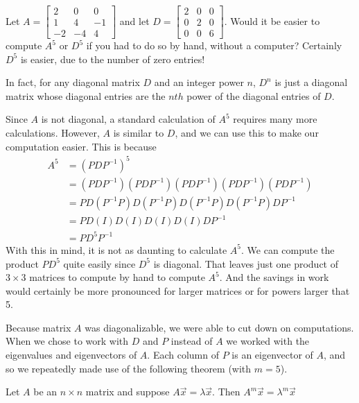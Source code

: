 \documentclass{ximera}
\begin{document}
  \begin{exploration}

  Let $A=\begin{bmatrix}
  2 & 0 & 0 \\
  1 & 4 & -1 \\
  -2 & -4 & 4
  \end{bmatrix}$ and let $D=\begin{bmatrix}
  2 & 0 & 0 \\
  0 & 2 & 0 \\
  0 & 0 & 6
  \end{bmatrix}$. 
  Would it be easier to compute $A^5$ or $D^5$ if you had to do so by hand, without a computer?  Certainly $D^5$ is easier, due to the number of zero entries!  
   
  In fact, for any diagonal matrix $D$ and an integer power $n$, $D^n$ is just a diagonal matrix whose diagonal entries are the $nth$ power of the diagonal entries of $D$.
   
  Since $A$ is not diagonal, a standard calculation of $A^5$ requires many more calculations.  However, $A$ is similar to $D$, and we can use this to make our computation easier.  This is because
  \begin{align*}
      A^5&=\left(PDP^{-1}\right)^5 \\
         &=(PDP^{-1})(PDP^{-1})(PDP^{-1})(PDP^{-1})(PDP^{-1}) \\
         &=PD(P^{-1}P)D(P^{-1}P)D(P^{-1}P)D(P^{-1}P)DP^{-1} \\
         &=PD(I)D(I)D(I)D(I)DP^{-1} \\
         &=PD^5P^{-1}
  \end{align*}
  With this in mind, it is not as daunting to calculate $A^5$.  We can compute the product $PD^5$ quite easily since $D^5$ is diagonal.  That leaves just one product of $3 \times 3$ matrices to compute by hand to compute $A^5$.  And the savings in work would certainly be more pronounced for larger matrices or for powers larger that 5.
\end{exploration}
   
  Because matrix $A$ was diagonalizable, we were able to cut down on computations.  When we chose to work with $D$ and $P$ instead of $A$ we worked with the eigenvalues and eigenvectors of $A$.  Each column of $P$ is an eigenvector of $A$, and so we repeatedly made use of the following theorem (with $m=5$).
   
  \begin{theorem}\label{th:eigpowers}
  Let $A$ be an $n \times n$ matrix and suppose $A\vec{x}=\lambda \vec{x}$.  Then $A^m \vec{x} = \lambda^m \vec{x}$
  \end{theorem}
   
\end{document}
